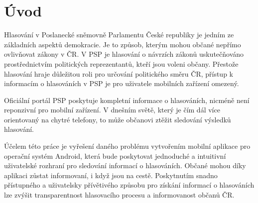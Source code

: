 \chapter*{Úvod}

Hlasování v Poslanecké sněmovně Parlamentu České republiky je jedním ze základních aspektů demokracie. Je to způsob, kterým mohou občané nepřímo ovlivňovat zákony v ČR. V PSP je hlasování o návrzích zákonů uskutečňováno prostřednictvím politických reprezentantů, kteří jsou voleni občany. Přestože hlasování hraje důležitou roli pro určování politického směru \linebreak ČR, přístup k informacím o hlasováních v PSP je pro uživatele mobilních zařízení omezený.

Oficiální portál PSP \cite{psp} poskytuje kompletní informace o hlasováních, nicméně není reponzivní pro mobilní zařízení. V dnešním světě, který je čím dál více orientovaný na chytré telefony, to může občanovi ztěžit sledování výsledků hlasování.

Účelem této práce je vyřešení daného problému vytvořením mobilní aplikace pro operační systém Android, která bude poskytovat jednoduché a intuitivní uživatelské rozhraní pro sledování informací o hlasováních. Občané mohou díky aplikaci zůstat informovaní, i když jsou na cestě. Poskytnutím snadno přístupného a uživatelsky přívětivého způsobu pro získání informací o hlasováních lze zvýšit transparentnost hlasovacího procesu a informovanost občanů ČR.